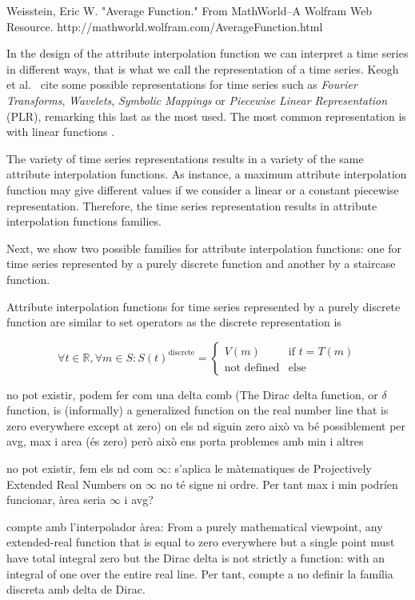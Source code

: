 {\begin{itemize}
Weisstein, Eric W. "Average Function." From MathWorld--A Wolfram Web Resource. http://mathworld.wolfram.com/AverageFunction.html


\end{itemize}


In the design of the attribute interpolation function we can interpret
a time series in different ways, that is what we call the
representation of a time series. Keogh et al.\ \cite{last:keogh} cite some
possible representations for time series such as \emph{Fourier
  Transforms}, \emph{Wavelets}, \emph{Symbolic Mappings} or
\emph{Piecewise Linear Representation} (PLR), remarking this last as
the most used. The most common representation is with linear functions
\cite{keogh01}.  

The variety of time series representations results in a variety of the
same attribute interpolation functions. As instance, a maximum
attribute interpolation function may give different values if we
consider a linear or a constant piecewise representation. Therefore,
the time series representation results in attribute interpolation
functions families.


Next, we show two possible families for attribute interpolation
functions: one for time series represented by a purely discrete
function and another by a staircase function.


Attribute interpolation functions for time series represented by a
purely discrete function are similar to set operators as the discrete representation is  

$$
\forall t \in \mathbb{R}  ,\forall m \in S:
S(t)^{\text{discrete}} =  
\begin{cases}
  V(m) & \text{if }  t=T(m) \\
  \text{not defined} & \text{else} 
\end{cases}
$$


no pot existir, podem fer com una delta comb (The Dirac delta function, or $\delta$ function, is (informally) a generalized function on the real number line that is zero everywhere except at zero) on els nd siguin zero això va bé possiblement per avg, max i area (és zero) però això ens porta problemes amb min i altres

no pot existir, fem els nd com $\infty$: s'aplica le màtematiques de Projectively Extended Real Numbers on $\infty$ no té signe ni ordre. Per tant max i min podríen funcionar, àrea seria $\infty$ i avg?


compte amb l'interpolador àrea: From a purely mathematical viewpoint, any extended-real function that is equal to zero everywhere but a single point must have total integral zero but the Dirac delta is not strictly a function: with an integral of one over the entire real line. Per tant, compte a no definir la família discreta amb delta de Dirac.







}


